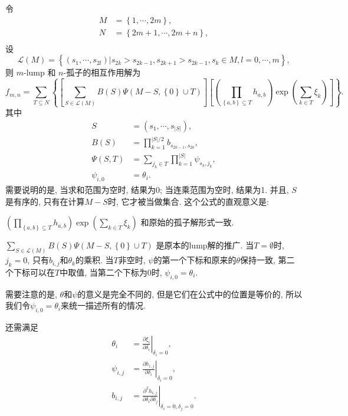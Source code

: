 \documentclass{article}
\newcommand{\sbrace}[1]{\left(#1\right)}
\newcommand{\mbrace}[1]{\left[#1\right]}
\newcommand{\bbrace}[1]{\left\{#1\right\}}
\newcommand{\eval}[2]{\left.{#1}\right|_{#2}}
\newcommand{\DIFF}[2]{\ensuremath{\frac{\partial #1}{\partial #2}}}
\begin{document}
令
\begin{equation}
\begin{aligned}
M&=\bbrace{1,\cdots,2m}, \\ 
N&=\bbrace{2m+1,\cdots,2m+n}, \\ 
\end{aligned}
\end{equation}
设
\begin{equation}
\mathcal{L}(M)=\bbrace{\sbrace{s_1,\cdots,s_{2l}}|s_{2k}>s_{2k-1},s_{2k+1}>s_{2k-1},s_k\in M,l=0,\cdots,m} , 
\end{equation}
则 $m$-lump 和 $n$-孤子的相互作用解为
\begin{equation}
f_{m,n}=\sum_{T\subseteq N}\bbrace{
  \mbrace{
    \sum_{S\in \mathcal{L}(M)}{
      B(S)
      \Psi\sbrace{M-S,\bbrace{0}\cup T}
    }
  }
  \mbrace{
    \sbrace{\prod_{\bbrace{a,b}\subseteq T}{h_{a,b}}}
    \exp\sbrace{\sum_{k\in T}{\xi_k}}
  }
}. 
\end{equation}
其中 
\begin{equation}
\begin{aligned}
S&=\sbrace{s_1,\cdots,s_{|S|}}, \\ 
B(S)&=\prod_{k=1}^{|S|/2}{b_{s_{2k-1},s_{2k}}},\\ 
\Psi(S,T)&=\sum_{j_k\in T}{\prod_{k=1}^{|S|}{\psi_{s_k,j_k}}}, \\ 
\psi_{i,0}&=\theta_i . 
\end{aligned}
\end{equation}
需要说明的是, 当求和范围为空时, 结果为0; 当连乘范围为空时, 结果为1. 并且, $S$是有序的, 只有在计算$M-S$时, 它才被当做集合. 这个公式的直观意义是:
\begin{compactitem}[\textbullet]
\item $\sbrace{\prod_{\bbrace{a,b}\subseteq T}{h_{a,b}}}\exp\sbrace{\sum_{k\in T}{\xi_k}}$ 和原始的孤子解形式一致.
\item $\sum_{S\in \mathcal{L}(M)}{B(S)\Psi\sbrace{M-S,\bbrace{0}\cup T}}$ 是原本的lump解的推广. 当$T=\emptyset$时, $j_k=0$, 只有$b_{i,j}$和$\theta_k$的乘积. 当$T$非空时, $\psi$的第一个下标和原来的$\theta$保持一致, 第二个下标可以在$T$中取值, 当第二个下标为0时, $\psi_{i,0}=\theta_i$. 
\item 需要注意的是, $\theta$和$\psi$的意义是完全不同的, 但是它们在公式中的位置是等价的, 所以我们令$\psi_{i,0}=\theta_i$来统一描述所有的情况. 
\end{compactitem}

还需满足 
\begin{equation}
\begin{aligned} 
\theta_i &= \eval{\DIFF{\xi_i}{\delta_i}}{\delta_i=0},\\ 
\psi_{i,j} &= \eval{\DIFF{h_{i,j}}{\delta_i}}{\delta_i=0} ,\\ 
b_{i,j} &= \eval{\frac{\partial^2 h_{i,j}}{\partial \delta_i \partial \delta_j}}{\delta_i=0,\delta_j=0} .
\end{aligned}
\end{equation}
\end{document}
